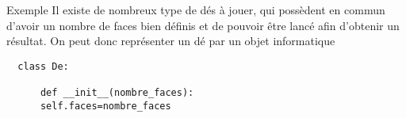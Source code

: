 \documentclass[10pt]{beamer}
\begin{document}
\begin{frame}[fragile]
	\mframe{\POO}
	\begin{exampleblock}{Exemple}
		Il existe de nombreux type de dés à jouer, qui possèdent en commun d'avoir un nombre de faces bien définis et de pouvoir être lancé afin d'obtenir un résultat. On peut donc représenter un dé par un objet informatique
		\begin{lstlisting}
  class De:
    
      def __init__(nombre_faces):
      self.faces=nombre_faces
		
\end{lstlisting}
	\end{exampleblock}
\end{frame}
\end{document}
